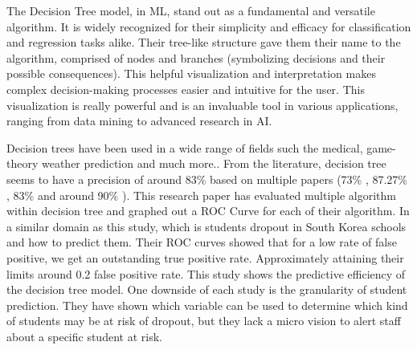 \documentclass[../../../main.tex]{subfiles}
\begin{document}
The Decision Tree model, in ML, stand out as a fundamental and versatile algorithm. It is widely recognized for their simplicity and efficacy for classification and regression tasks alike.
Their tree-like structure gave them their name to the algorithm, comprised of nodes and branches (symbolizing decisions and their possible consequences). This helpful visualization and interpretation makes complex decision-making processes easier and intuitive for the user. This visualization is really powerful and is an invaluable tool in various applications, ranging from data mining to advanced research in AI.

Decision trees have been used in a wide range of fields such the medical, game-theory weather prediction and much more.\cite{quinlan_induction_1986}.
From the literature, decision tree seems to have a precision of around 83\% based on multiple papers (73\% \cite{viloria_integration_2019}, 87.27\% \cite{ramirez_prediction_2018}, 83\%\cite{kemper_predicting_2020} and around 90\% \cite{tenpipat_student_2020}). This research paper has evaluated multiple algorithm within decision tree and graphed out a ROC Curve for each of their algorithm. In a similar domain as this study, which is students dropout in South Korea schools and how to predict them. Their ROC curves showed that for a low rate of false positive, we get an outstanding true positive rate. Approximately attaining their limits around 0.2 false positive rate\cite{lee_machine_2019}. This study shows the predictive efficiency of the decision tree model. 
One downside of each study is the granularity of student prediction. They have shown which variable can be used to determine which kind of students may be at risk of dropout, but they lack a micro vision to alert staff about a specific student at risk.
\end{document}
